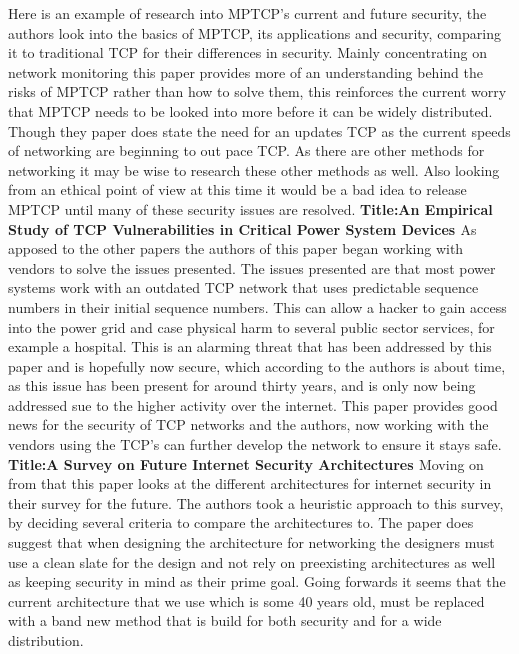 \documentclass{scrartcl}
\begin{document}
	\newline
Here is an example of research into MPTCP's current and future security, the authors look into the basics of MPTCP, its applications and security, comparing it to traditional TCP for their differences in security. Mainly concentrating on network monitoring this paper provides more of an understanding behind the risks of MPTCP rather than how to solve them, this reinforces the current worry that MPTCP needs to be looked into more before it can be widely distributed. Though they paper does state the need for an updates TCP as the current speeds of networking are beginning to out pace TCP. As there are other methods for networking it may be wise to research these other methods as well. Also looking from an ethical point of view at this time it would be a bad idea to release MPTCP until many of these security issues are resolved.
	\newline
	\newline
	\newline
	\textbf{Title:An Empirical Study of TCP Vulnerabilities in Critical Power System Devices \cite{Vulnerablilities}}
	\newline
As apposed to the other papers the authors of this paper began working with vendors to solve the issues presented. The issues presented are that most power systems work with an outdated TCP network that uses predictable sequence numbers in their initial sequence numbers. This can allow a hacker to gain access into the power grid and case physical harm to several public sector services, for example a hospital. This is an alarming threat that has been addressed by this paper and is hopefully now secure, which according to the authors is about time, as this issue has been present for around thirty years, and is only now being addressed sue to the higher activity over the internet. This paper provides good news for the security of TCP networks and the authors, now working with the vendors using the TCP's can further develop the network to ensure it stays safe.
	\newline
	\newline
	\newline
	\textbf{Title:A Survey on Future Internet Security Architectures \cite{Future}}
	\newline
Moving on from that this paper looks at the different architectures for internet security in their survey for the future. The authors took a heuristic approach to this survey, by deciding several criteria to compare the architectures to. The paper does suggest that when designing the architecture for networking the designers must use a clean slate for the design and not rely on preexisting architectures as well as keeping security in mind as their prime goal. Going forwards it seems that the current architecture that we use which is some 40 years old, must be replaced with a band new method that is build for both security and for a wide distribution.
\end{document}
